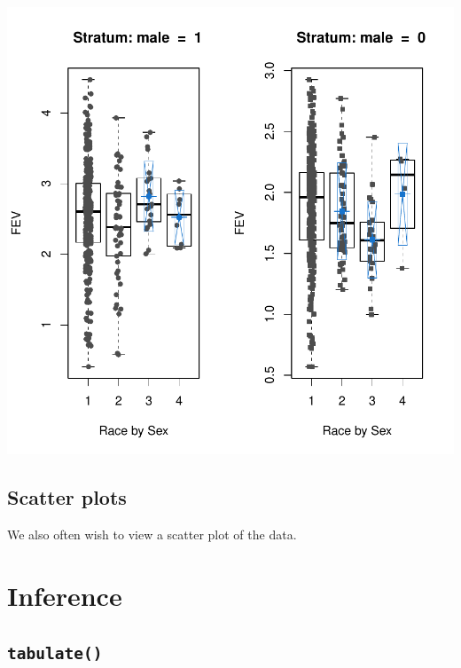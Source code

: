 \documentclass{article}
\begin{document}
\includegraphics{exampledoc-010}

\subsection{Scatter plots}
We also often wish to view a scatter plot of the data. 

\section{Inference}
\subsection{\texttt{tabulate()}}
\end{document}
